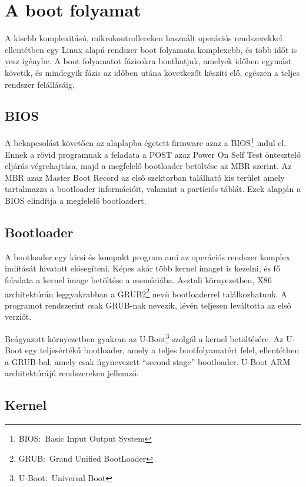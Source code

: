 \section{A boot folyamat}

A kisebb komplexitású, mikrokontrollereken használt operációs rendszerekkel
ellentétben egy Linux alapú rendszer boot folyamata komplexebb, és több időt is
vesz igénybe. A boot folyamatot fázisokra bonthatjuk, amelyek időben egymást
követik, és mindegyik fázis az időben utána következőt készíti elő, egészen a
teljes rendszer felállásáig.

\subsection{BIOS}

A bekapcsolást követően az alaplapba égetett firmware azaz a
BIOS\footnote{BIOS:~Basic Input Output System} indul el. Ennek a rövid programnak
a feladata a POST azaz Power On Self Test öntesztelő eljárás végrehajtása, majd a
megfelelő bootloader betöltése az MBR szerint. Az MBR azaz Master Boot Record az
első szektorban található kis terület amely tartalmazza a bootloader
információit, valamint a partíciós táblát. Ezek alapján a BIOS elindítja a
megfelelő bootloadert.

\subsection{Bootloader}

A bootloader egy kicsi és kompakt program ami az operációs rendszer komplex
indítását hivatott elősegíteni. Képes akár több kernel imaget is kezelni, és fő
feladata a kernel image betöltése a memóriába. Asztali környezetben, X86
architektúrán leggyakrabban a GRUB2\footnote{GRUB:~Grand Unified BootLoader} nevű
bootloaderrel találkozhatunk. A programot rendszerint csak GRUB-nak nevezik,
lévén teljesen leváltotta az első verziót.

Beágyazott környezetben gyakran az U-Boot\footnote{U-Boot:~Universal Boot}
szolgál a kernel betöltésére. Az U-Boot egy teljesértékű bootloader, amely a
teljes bootfolyamatért felel, ellentétben a GRUB-bal, amely csak úgynevezett
``second stage'' bootloader. U-Boot ARM architektúrájú rendszereken jellemző.

\subsection{Kernel}

